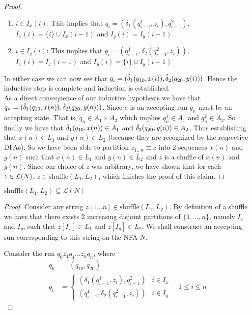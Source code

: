 \begin{soln}
\begin{proof}
\begin{enumerate}
    \item $i \in I_x(i)$: This implies that $q_i = (\delta_1(q_{i-1}^1, z_i), q_{i-1}^2)$, $I_x(i) = \{i\} \cup I_x(i-1)$ and $I_y(i) = I_y(i-1)$
    
    \item $i \in I_y(i)$: This implies that $q_i = (q_{i-1}^1, \delta_2(q_{i-1}^2, z_i))$, $I_x(i) = I_x(i-1)$ and $I_y(i) = \{i\} \cup I_y(i-1)$
\end{enumerate}

In either case we can now see that $q_i = (\hat{\delta}_1(q_{10}, x(i)), \hat{\delta}_2(q_{20}, y(i)))$. Hence the inductive step is complete and induction is established.\\

As a direct consequence of our inductive hypothesis we have that $q_n = (\hat{\delta}_1(q_{10}, x(n)), \hat{\delta}_2(q_{20}, y(n)))$. Since $e$ is an accepting run $q_n$ must be an accepting state. That is, $q_n \in A_1 \times A_2$ which implies $q_n^1 \in A_1$ and $q_n^2 \in A_2$. So finally we have that $\hat{\delta}_1(q_{10}, x(n)) \in A_1$ and $\hat{\delta}_2(q_{20}, y(n)) \in A_2$. Thus establishing that $x(n) \in L_1$ and $y(n) \in L_2$ (because they are recognized by the respective DFAs). So we have been able to partition $z_{1 \ldots n} \equiv z$ into 2 sequences $x(n)$ and $y(n)$ such that $x(n) \in L_1$ and
$y(n) \in L_2$ and $z$ is a \textrm{shuffle} of $x(n)$ and $y(n)$. Since our choice of $z$ was arbitrary, we have shown that for each $z \in \mathcal{L}(N)$, $z \in \mathrm{shuffle}(L_1, L_2)$, which finishes the proof of this claim.
\end{proof}

\begin{claim}
$\mathrm{shuffle}(L_1, L_2) \subseteq \mathcal{L}(N)$
\end{claim}

\begin{proof}

Consider any string $z[1 \ldots n] \in \mathrm{shuffle}(L_1, L_2)$. By definition of a \textrm{shuffle} we have that there exists 2 increasing disjoint partitions of $\{1, \ldots, n\}$, namely $I_x$ and $I_y$, such that $z[I_x] \in L_1$ and $z[I_y] \in L_2$. We shall construct an accepting run corresponding to this string on the NFA $N$.

Consider the run $q_0 z_1 q_1 \ldots z_n q_n$, where 
\begin{align*}
q_0 &= (q_{10}, q_{20})\\
q_i &= \begin{cases}
    (\delta_1(q_{i-1}^1, z_i), q_{i-1}^2) & i \in I_x \\
    (q_{i-1}^1, \delta_2(q_{i-1}^2, z_i)) & i \in I_y
\end{cases} \quad 1 \leq i \leq n
\end{align*}


\end{proof}
\end{soln}
